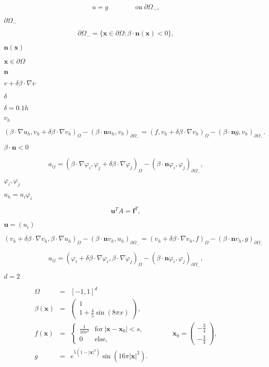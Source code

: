 \documentclass{article}
\begin{document}
\[ u = g \qquad\qquad \mathrm{on}\ \partial\Omega_-, \]
\pagebreak

$\partial\Omega_-$
\pagebreak

\[ \partial\Omega_- = \{{\mathbf x}\in \partial\Omega: \beta\cdot{\mathbf n}({\mathbf x}) < 0\}, \]
\pagebreak

${\mathbf n}({\mathbf x})$
\pagebreak

${\mathbf x}\in\partial\Omega$
\pagebreak

${\mathbf n}$
\pagebreak

$v + \delta \beta\cdot\nabla v$
\pagebreak

$\delta$
\pagebreak

$\delta=0.1h$
\pagebreak

$v_h$
\pagebreak

\[ (\beta \cdot \nabla u_h, v_h + \delta \beta\cdot\nabla v_h)_\Omega - (\beta\cdot {\mathbf n} u_h, v_h)_{\partial\Omega_-} = (f, v_h + \delta \beta\cdot\nabla v_h)_\Omega - (\beta\cdot {\mathbf n} g, v_h)_{\partial\Omega_-}. \]
\pagebreak

$\beta\cdot{\mathbf n}<0$
\pagebreak

\[ a_{ij} = (\beta \cdot \nabla \varphi_i, \varphi_j + \delta \beta\cdot\nabla \varphi_j)_\Omega - (\beta\cdot {\mathbf n} \varphi_i, \varphi_j)_{\partial\Omega_-}, \]
\pagebreak

$\varphi_i,\varphi_j$
\pagebreak

$u_h = u_i \varphi_i$
\pagebreak

\[ {\mathbf u}^T A = {\mathbf f}^T, \]
\pagebreak

${\mathbf u}=(u_i)$
\pagebreak

\[ (v_h + \delta \beta\cdot\nabla v_h, \beta \cdot \nabla u_h)_\Omega - (\beta\cdot {\mathbf n} v_h, u_h)_{\partial\Omega_-} = (v_h + \delta \beta\cdot\nabla v_h, f)_\Omega - (\beta\cdot {\mathbf n} v_h, g)_{\partial\Omega_-} \]
\pagebreak

\[ a_{ij} = (\varphi_i + \delta \beta \cdot \nabla \varphi_i, \beta\cdot\nabla \varphi_j)_\Omega - (\beta\cdot {\mathbf n} \varphi_i, \varphi_j)_{\partial\Omega_-}, \]
\pagebreak

$d=2$
\pagebreak

\begin{eqnarray*} \Omega &=& [-1,1]^d \\ \beta({\mathbf x}) &=& \left( \begin{array}{c}1 \\ 1+\frac 45 \sin(8\pi x)\end{array} \right), \\ f({\mathbf x}) &=& \left\{ \begin{array}{ll} \frac 1{10 s^d} & \mathrm{for}\ |{\mathbf x}-{\mathbf x}_0|<s, \\ 0 & \mathrm{else}, \end{array} \right. \qquad\qquad {\mathbf x}_0 = \left( \begin{array}{c} -\frac 34 \\ -\frac 34\end{array} \right), \\ g &=& e^{5(1-|{\mathbf x}|^2)} \sin(16\pi|{\mathbf x}|^2). \end{eqnarray*}
\pagebreak
\end{document}
